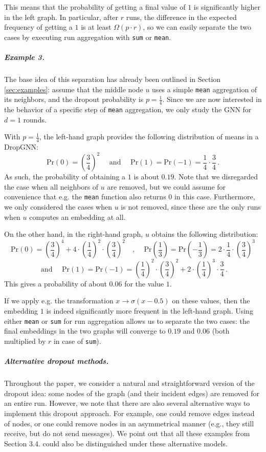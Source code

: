 \documentclass{article}
\begin{document}
This means that the probability of getting a final value of $1$ is significantly higher in the left graph. In particular, after $r$ runs, the difference in the expected frequency of getting a $1$ is at least $\Omega(p \cdot r)$, so we can easily separate the two cases by executing run aggregation with \texttt{sum} or \texttt{mean}.

\subparagraph*{Example 3.} The base idea of this separation has already been outlined in Section \ref{sec:examples}: assume that the middle node $u$ uses a simple \texttt{mean} aggregation of its neighbors, and the dropout probability is $p=\frac{1}{4}$. Since we are now interested in the behavior of a specific step of \texttt{mean} aggregation, we only study the GNN for $d=1$ rounds.

With $p=\frac{1}{4}$, the left-hand graph provides the following distribution of means in a DropGNN:
\[ \text{Pr}(0)=\left( \frac{3}{4} \right)^2 \quad \text{ and } \quad \text{Pr}(1)=\text{Pr}(-1)=\frac{1}{4} \cdot \frac{3}{4} \, .\]
As such, the probability of obtaining a $1$ is about $0.19$. Note that we disregarded the case when all neighbors of $u$ are removed, but we could assume for convenience that e.g. the \texttt{mean} function also returns $0$ in this case. Furthermore, we only considered the cases when $u$ is not removed, since these are the only runs when $u$ computes an embedding at all.

On the other hand, in the right-hand graph, $u$ obtains the following distribution:
\[ \text{Pr}(0)=\left( \frac{3}{4} \right)^4+4 \cdot \left( \frac{1}{4} \right)^2 \cdot \left( \frac{3}{4} \right)^2 \quad \text{, } \quad \text{Pr}\left(\frac{1}{3}\right)=\text{Pr}\left(-\frac{1}{3}\right)=2 \cdot \frac{1}{4} \cdot \left( \frac{3}{4} \right)^3 \]
\[ \text{ and } \quad \text{Pr}(1)=\text{Pr}(-1)= \left( \frac{1}{4} \right)^2 \cdot \left( \frac{3}{4} \right)^2 + 2 \cdot \left( \frac{1}{4} \right)^3 \cdot \frac{3}{4} \,. \]
This gives a probability of about $0.06$ for the value $1$.

If we apply e.g. the transformation $x \rightarrow \sigma(x-0.5)$ on these values, then the embedding $1$ is indeed significantly more frequent in the left-hand graph. Using either \texttt{mean} or \texttt{sum} for run aggregation allows us to separate the two cases: the final embeddings in the two graphs will converge to $0.19$ and $0.06$ (both multiplied by $r$ in case of \texttt{sum}).

\subparagraph*{Alternative dropout methods.} Throughout the paper, we consider a natural and straightforward version of the dropout idea: some nodes of the graph (and their incident edges) are removed for an entire run. However, we note that there are also several alternative ways to implement this dropout approach. For example, one could remove edges instead of nodes, or one could remove nodes in an asymmetrical manner (e.g., they still receive, but do not send messages). We point out that all these examples from Section 3.4. could also be distinguished under these alternative models.
\end{document}
